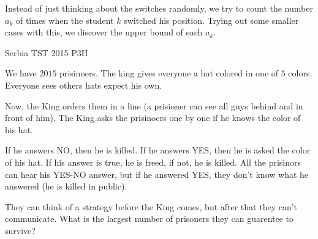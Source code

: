 \begin{solution}
    Instead of just thinking about the switches randomly, we try to count the
    number $a_k$ of times when the student $k$ switched his position. Trying
    out some smaller cases with this, we discover the upper bound of each $a_k$.
\end{solution}


{Serbia TST 2015 P3}{H}{
    We have $2015$ prisinoers. The king gives everyone a hat colored
    in one of $5$ colors. Everyone sees others hats expect his own.

    Now, the King orders them in a line (a prisioner can see all guys behind
    and in front of him). The King asks the prisinoers one by one if he knows
    the color of his hat.

    If he answers NO, then he is killed. If he answers YES, then he is asked
    the color of his hat. If his answer is true, he is freed, if not, he is
    killed. All the prisinors can hear his YES-NO answer, but if he answered
    YES, they don't know what he answered (he is killed in public). 

    They can think of a strategy before the King comes, but after that they
    can't communicate. What is the largest number of prisoners they can guarentee
    to survive?

}

